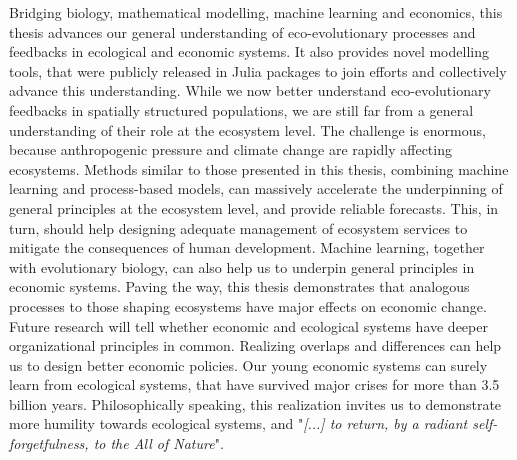 Bridging biology, mathematical modelling, machine learning and economics, this thesis advances our general understanding of eco-evolutionary processes and feedbacks in ecological and economic systems. It also provides novel modelling tools, that were publicly released in Julia packages to join efforts and collectively advance this understanding.
% 
While we now better understand eco-evolutionary feedbacks in spatially structured populations, we are still far from a general understanding of their role at the ecosystem level. 
% 
The challenge is enormous, because anthropogenic pressure and climate change are rapidly affecting ecosystems.
% 
Methods similar to those presented in this thesis, combining machine learning and process-based models, can massively accelerate the underpinning of general principles at the ecosystem level, and provide reliable forecasts. This, in turn, should help designing adequate management of ecosystem services to mitigate the consequences of human development.
% 
Machine learning, together with evolutionary biology, can also help us to underpin general principles in economic systems. Paving the way, this thesis demonstrates that analogous processes to those shaping ecosystems have major effects on economic change. Future research will tell whether economic and ecological systems have deeper organizational principles in common.
% 
Realizing overlaps and differences can help us to design better economic policies. 
% 
Our young economic systems can surely learn from ecological systems, that have survived major crises for more than 3.5 billion years.
% 
Philosophically speaking, this realization invites us to demonstrate more humility towards ecological systems, and "\textit{[...] to return, by a radiant self-forgetfulness, to the All of Nature}".